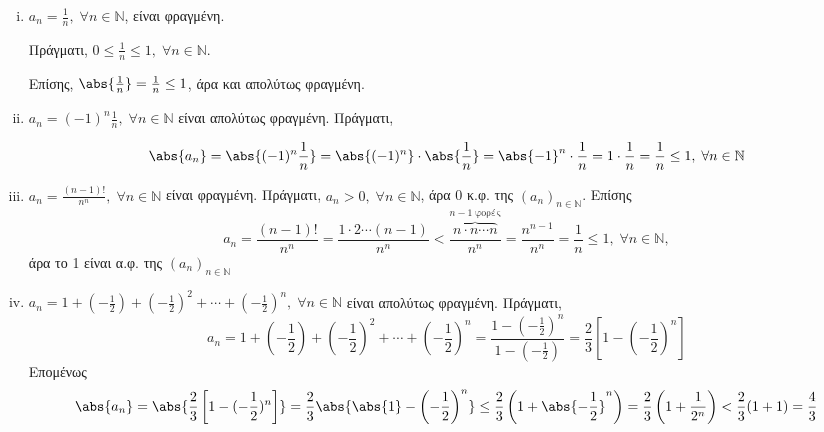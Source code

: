 \documentclass[main.tex]{subfiles}
\begin{document}
\begin{examples}
\item {}  
    \begin{enumerate}[i)]
        \item $ a_{n}= \frac{1}{n}, \; \forall n \in \mathbb{N} $, είναι φραγμένη.

            Πράγματι, $ 0 \leq \frac{1}{n} \leq 1, \; \forall n \in \mathbb{N} $. 

            Επίσης, $ \abs{\frac{1}{n}} = \frac{1}{n} \leq 1 $, άρα και 
            απολύτως φραγμένη.
        \item $ a_{n}=(-1)^{n} \frac{1}{n}, \; \forall n \in \mathbb{N} $ 
            είναι απολύτως φραγμένη. Πράγματι,

            \[
                \abs{a_{n}} = \abs{(-1)^{n} \frac{1}{n}} = \abs{(-1)^{n}} 
                \cdot \abs{\frac{1}{n}} = \abs{-1}^{n} \cdot \frac{1}{n}
                = 1 \cdot \frac{1}{n} = \frac{1}{n} \leq 1, \; \forall n \in 
                \mathbb{N}
            \] 

        \item $ a_{n}= \frac{(n-1)!}{n^{n}}, \; \forall n \in \mathbb{N} $
            είναι φραγμένη. Πράγματι, $ a_{n} > 0, \; \forall n \in 
            \mathbb{N}$, άρα 0 κ.φ. της $( a_{n})_{n \in \mathbb{N}} $. 
            Επίσης 
            \[
                a_{n}= \frac{(n-1)!}{n^{n}} = \frac{1 \cdot 2 \cdots
                    (n-1)}{n^{n}} < \frac{\overbrace{n \cdot n \cdots n}
                ^{n-1 \; \text{φορές}}}{n^{n}} = \frac{n^{n-1}}{n^{n}} =
                \frac{1}{n} \leq 1, \; \forall n \in \mathbb{N},
            \] άρα το 1 είναι α.φ. της $ (a_{n})_{n \in \mathbb{N}} $ 

        \item $ a_{n}= 1 + \left(- \frac{1}{2} \right) + \left(- 
            \frac{1}{2}\right)^{2} + \cdots + \left(-\frac{1}{2} \right) ^{n}, 
            \; \forall n \in \mathbb{N} $ είναι απολύτως φραγμένη. Πράγματι, 
            \[ a_{n} = 1 + \left(- \frac{1}{2}\right) + \left(- \frac{1}{2} 
                \right)^{2} + \cdots + \left(- \frac{1}{2} \right)^{n} = 
                \frac{1 - (- \frac{1}{2} )^{n}}{1 - (- \frac{1}{2})} = 
            \frac{2}{3} \left[1 - \left(- \frac{1}{2} \right)^{n}\right] \]
            Επομένως
            \[
                \abs{a_{n}} = \abs{\frac{2}{3} \left[1-(- \frac{1}{2} )^{n}\right]} = 
                \frac{2}{3} \abs{\abs{1} - \left(- \frac{1}{2}\right)^{n}} \leq 
                \frac{2}{3} \left(1 + \abs{-\frac{1}{2} }^{n} \right) = 
                \frac{2}{3} \left(1+ \frac{1}{2^{n}}\right) < \frac{2}{3}
                (1+1) = \frac{4}{3} 
            \] 


\end{enumerate}
\end{examples}
\end{document}
